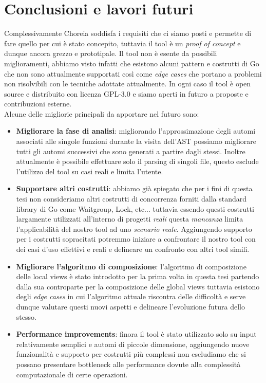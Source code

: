 \chapter{Conclusioni e lavori futuri}
Complessivamente Choreia soddisfa i requisiti che ci siamo posti e permette di fare quello per cui è stato concepito, tuttavia il tool è un \emph{proof of concept} e dunque ancora grezzo e prototipale. Il tool non è esente da possibili miglioramenti, abbiamo visto infatti che esistono alcuni pattern e costrutti di Go che non sono attualmente supportati così come \emph{edge cases} che portano a problemi non risolvibili con le tecniche adottate attualmente. In ogni caso il tool è open source e distribuito con licenza GPL-3.0 e siamo aperti in futuro a proposte e contribuzioni esterne.\bigskip \\
Alcune delle migliorie principali da apportare nel futuro sono:
\begin{itemize}
    \item \textbf{Migliorare la fase di analisi}: migliorando l'approssimazione degli automi associati alle singole funzioni durante la visita dell'AST possiamo migliorare tutti gli automi successivi che sono generati a partire dagli stessi. Inoltre attualmente è possibile effettuare solo il parsing di singoli file, questo esclude l'utilizzo del tool su casi reali e limita l'utente.
    \item \textbf{Supportare altri costrutti}: abbiamo già spiegato che per i fini di questa tesi non consideriamo altri costrutti di concorrenza forniti dalla standard library di Go come Waitgroup, Lock, etc... tuttavia essendo questi costrutti largamente utilizzati all'interno di progetti \emph{reali} questa \emph{mancanza} limita l'applicabilità del nostro tool ad uno \emph{scenario reale}. Aggiungendo supporto per i costrutti sopracitati potremmo iniziare a confrontare il nostro tool con dei casi d'uso effettivi e reali e delineare un confronto con altri tool simili.
    \item \textbf{Migliorare l'algoritmo di composizione}: l'algoritmo di composizione delle local views è stato introdotto per la prima volta in questa tesi partendo dalla sua controparte per la composizione delle global views \cite{CA_Composition} tuttavia esistono degli \emph{edge cases} in cui l'algoritmo attuale riscontra delle difficoltà e serve dunque valutare questi nuovi aspetti e delineare l'evoluzione futura dello stesso.
    \item \textbf{Performance improvements}: finora il tool è stato utilizzato solo su input relativamente semplici e automi di piccole dimensione, aggiungendo nuove funzionalità e supporto per costrutti più complessi non escludiamo che si possano presentare bottleneck alle performance dovute alla complessità computazionale di certe operazioni.
\end{itemize}
